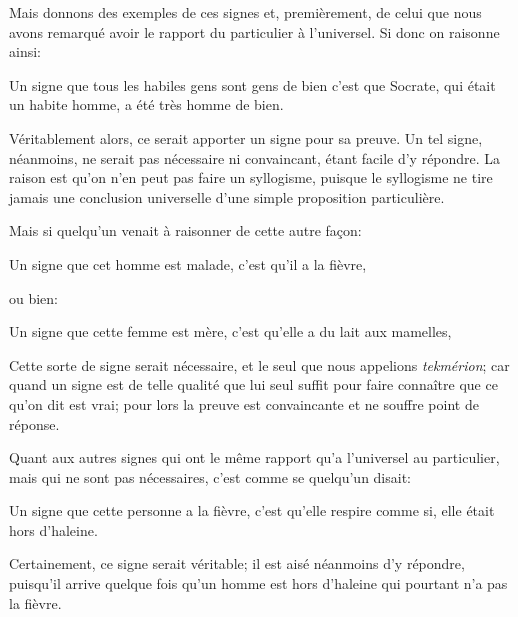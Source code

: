 \medbreak

Mais donnons des exemples de ces signes et, premièrement, de celui que nous avons remarqué avoir le rapport du particulier à l'universel. Si donc on
raisonne ainsi:

\begin{emphpar}
      Un signe que tous les habiles gens sont gens de bien c'est que Socrate, qui était un habite homme, a été très homme de bien.
\end{emphpar}

Véritablement alors, ce serait apporter un signe pour sa preuve. Un tel signe, néanmoins, ne serait pas nécessaire ni convaincant, étant facile
d'y répondre. La raison est qu'on n'en peut pas faire un syllogisme, puisque le syllogisme ne tire jamais une conclusion universelle d'une simple
proposition particulière.

Mais si quelqu'un venait à raisonner de cette autre façon:

\begin{emphpar}
      Un signe que cet homme est malade, c'est qu'il a la fièvre,
\end{emphpar}

ou bien:

\begin{emphpar}
      Un signe que cette femme est mère, c'est qu'elle a du lait aux mamelles,
\end{emphpar}

Cette sorte de signe serait nécessaire, et le seul que nous appelions \emph{tekmérion}; car quand un signe est de telle qualité que lui seul suffit
pour faire connaître que ce qu'on dit est vrai; pour lors la preuve est convaincante et ne souffre point de réponse.

Quant aux autres signes qui ont le même rapport qu'a l'universel au particulier, mais qui ne sont pas nécessaires, c'est comme se quelqu'un disait:

\begin{emphpar}
      Un signe que cette personne a la fièvre, c'est  qu'elle respire comme si, elle était hors d'haleine.
\end{emphpar}

Certainement, ce signe serait véritable; il est aisé néanmoins d'y répondre, puisqu'il arrive quelque fois qu'un homme est hors d'haleine qui
pourtant n'a pas la fièvre.

